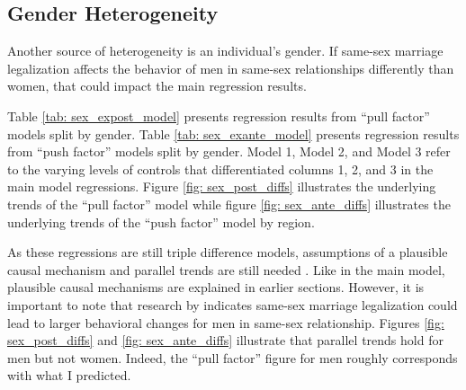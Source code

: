 \documentclass[12pt,letterpaper]{article}
\begin{document}
\begin{landscape}
\begin{scriptsize}
\begin{table}[h] %
    \centering
    
    \caption{}
    \label{tab: flow_expost_model}
\end{table}
\begin{table}[h]
    \centering
    
    \caption{}
    \label{tab: flow_exante_model}
\end{table}
\end{scriptsize}
\end{landscape}


\clearpage
\subsection{Gender Heterogeneity}

Another source of heterogeneity is an individual’s gender. If same-sex marriage legalization affects the behavior of men in same-sex relationships differently than women, that could impact the main regression results.

Table \ref{tab: sex_expost_model} presents regression results from “pull factor” models split by gender. Table \ref{tab: sex_exante_model} presents regression results from “push factor” models split by gender. Model 1, Model 2, and Model 3 refer to the varying levels of controls that differentiated columns 1, 2, and 3 in the main model regressions.  Figure \ref{fig: sex_post_diffs} illustrates the underlying trends of the “pull factor” model while figure \ref{fig: sex_ante_diffs} illustrates the underlying trends of the “push factor” model by region.

As these regressions are still triple difference models, assumptions of a plausible causal mechanism and parallel trends are still needed \citep{24, 25}. Like in the main model, plausible causal mechanisms are explained in earlier sections. However, it is important to note that research by \citet{1, 12} indicates same-sex marriage legalization could lead to larger behavioral changes for men in same-sex relationship. Figures \ref{fig: sex_post_diffs} and \ref{fig: sex_ante_diffs} illustrate that parallel trends hold for men but not women. Indeed, the “pull factor” figure for men roughly corresponds with what I predicted.
\end{document}
